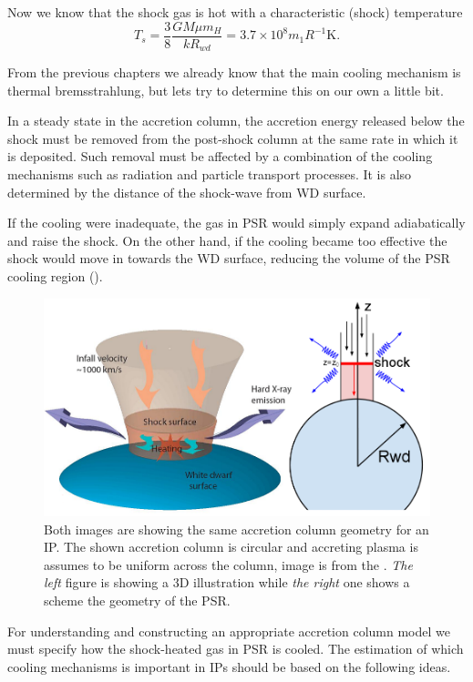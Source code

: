 \documentclass[oneside,a4paper,11pt]{report}
\begin{document}
Now we know that the shock gas is hot with a characteristic (shock) temperature
\begin{equation}
\label{br_ts}
 T_s = \frac{3}{8}\frac{G M \mu m_H}{k R_{wd}}=3.7 \times 10^8 m_1 R^{-1} \mathrm{K}. 
\end{equation}

From the previous chapters we already know that the main cooling mechanism is thermal bremsstrahlung, but 
lets try to determine this on our own a little bit. 

In a steady state in the accretion column, the accretion energy released below the shock must be removed 
from the post-shock column at the same rate in which it is deposited. Such removal must be affected 
by a combination of the cooling mechanisms such as radiation and particle transport processes. It is also 
determined by the distance of the shock-wave from WD surface. 

If the cooling were inadequate, the gas in PSR would simply expand adiabatically and raise 
the shock. On the other hand, if the cooling became too effective the shock would move in towards the 
WD surface, reducing the volume of the PSR cooling region (\citet{accpower:1}).  

\begin{figure}[hbt]
\centering
\includegraphics[totalheight=5cm]{plot/psr2}
\caption{Both images are showing the same accretion column geometry for an IP. The shown accretion column 
is circular and accreting plasma is assumes to be uniform across the column, image is from the \citet{krivonos_pres}. 
\textit{The left} figure is showing a
3D illustration while \textit{the right} one shows a scheme the geometry of the PSR.}
\label{psr1} 
\end{figure}

For understanding and constructing an appropriate accretion column model we must specify how the shock-heated 
gas in PSR is cooled. The estimation of which cooling mechanisms is important in IPs should be based on the
following ideas. 
\end{document}

